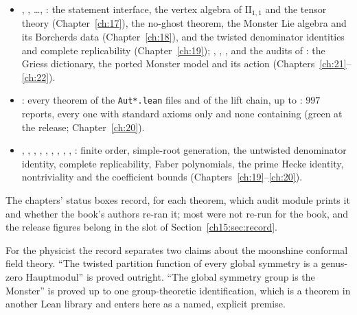 \begin{itemize}
  headlines are conditional on their explicit hypotheses, which the final theorem discharges.
\item {}, , \dots, : the statement interface, the
  vertex algebra of $\mathrm{II}_{1,1}$ and the tensor theory (Chapter~\ref{ch:17}), the no-ghost theorem, the Monster Lie
  algebra and its Borcherds data (Chapter~\ref{ch:18}), and the twisted denominator identities and complete replicability
  (Chapter~\ref{ch:19}); , , ,
   and the audits of : the Griess
  dictionary, the ported Monster model and its action (Chapters~\ref{ch:21}--\ref{ch:22}).
\item {}: every theorem of the \texttt{Aut*.lean} files and of the lift chain, up to
  : $997$ reports, every one with standard axioms only and none containing 
  (green at the release; Chapter~\ref{ch:20}).
\item {}, , ,
  , , ,
  , , ,
  : finite order, simple-root generation, the untwisted denominator identity, complete
  replicability, Faber polynomials, the prime Hecke identity, nontriviality and the coefficient bounds
  (Chapters~\ref{ch:19}--\ref{ch:20}).
\end{itemize}
The chapters' status boxes record, for each theorem, which audit module prints it and whether the book's authors re-ran
it; most were not re-run for the book, and the release figures belong in the slot of Section~\ref{ch15:sec:record}.

\begin{physics}
For the physicist the record separates two claims about the moonshine conformal field theory. ``The twisted partition
function of every global symmetry is a genus-zero Hauptmodul'' is proved outright. ``The global symmetry group is the
Monster'' is proved up to one group-theoretic identification, which is a theorem in another Lean library and enters
here as a named, explicit premise.
\end{physics}

